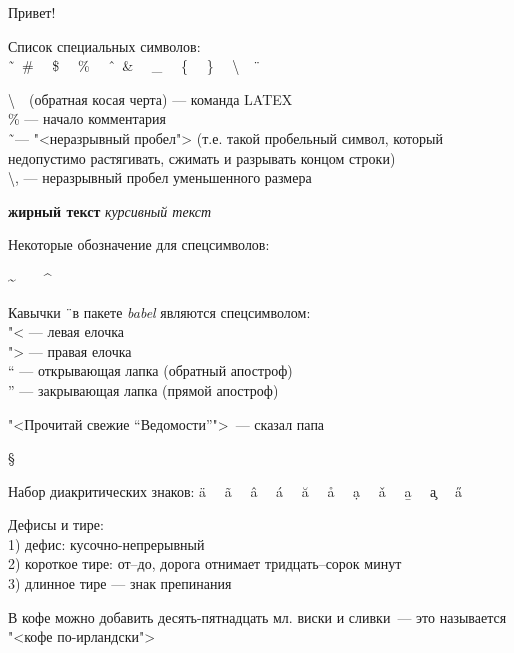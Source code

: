 



\noindent
Привет!

\bigskip
\noindent
Список специальных символов:
\\
\~             \ \
\#             \ \
\$             \ \
\%             \ \
\^             \ \
\&             \ \
\_             \ \
\{             \ \
\}             \ \
\textbackslash \ \
\" \


\noindent
\textbackslash \ \ (обратная косая черта) --- команда LATEX \\
\% --- начало комментария \\
\~ \ --- "<неразрывный пробел"> (т.е. такой пробельный символ, который недопустимо растягивать, сжимать и разрывать концом строки) \\
\textbackslash, --- неразрывный пробел уменьшенного размера

\noindent
{\bf жирный текст} {\it курсивный текст}

\noindent
Некоторые обозначение для спецсимволов:

\noindent
\textasciitilde \ \
\dq             \ \
\textasciicircum

\noindent
Кавычки  \" \ в пакете {\it babel} являются спецсимволом: \\
"< --- левая  елочка                                      \\
"> --- правая елочка                                      \\
"` --- открывающая лапка (обратный апостроф)              \\
"' --- закрывающая лапка (прямой апостроф)

\noindent
"<Прочитай свежие "`Ведомости"'">~--- сказал папа

\noindent
\S

\noindent
Набор диакритических знаков:
\"a   \ \
\~a   \ \
\^a   \ \
\'a   \ \
\u{a} \ \
\r{a} \ \
\d{a} \ \
\v{a} \ \
\b{a} \ \
\c{a} \ \
\H{a}

\noindent
Дефисы и тире:                                                  \\
1) дефис: кусочно-непрерывный                                   \\
2) короткое тире: от--до, дорога отнимает тридцать--сорок минут \\
3) длинное тире --- знак препинания

В кофе можно добавить десять-пятнадцать мл. виски и сливки~--- это называется "<кофе по-ирландски">

